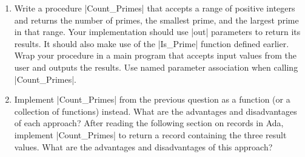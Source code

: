 \begin{enumerate}
\item Write a procedure |Count_Primes| that accepts a range of positive integers and returns the
  number of primes, the smallest prime, and the largest prime in that range. Your implementation
  should use |out| parameters to return its results. It should also make use of the |Is_Prime|
  function defined earlier. Wrap your procedure in a main program that accepts input values from
  the user and outputs the results. Use named parameter association when calling |Count_Primes|.

\item Implement |Count_Primes| from the previous question as a function (or a collection of
  functions) instead. What are the advantages and disadvantages of each approach? After reading
  the following section on records in Ada, implement |Count_Primes| to return a record
  containing the three result values. What are the advantages and disadvantages of this
  approach?
\end{enumerate}


